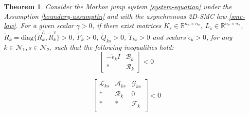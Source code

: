 \documentclass[conference]{IEEEtran}
\newtheorem{theorem}{Theorem}
\begin{document}
\begin{theorem}\label{theorem3}
	Consider the  Markov jump system \eqref{system-equation} under the Assumption \eqref{boundary-assumptin} and with the asynchronous 2D-SMC law \eqref{smc-law}.  For a given scalar $\gamma>0$, if there exist matrices $\tilde{K}_{s}\in\mathbb{R}^{n_u\times n_x}$, $L_{s}\in\mathbb{R}^{n_x\times n_x}$, $\tilde{R}_{k}=\mathrm{diag}\{\tilde{R}^{h}_{k},\tilde{R}^{v}_{k}\}>0$, $\tilde{F}_{k}>0$,  $\tilde{Q}_{ks}>0$, $\tilde{T}_{ks}>0$ and scalars $\tilde{\epsilon}_{k}>0$, for any $k\in\mathcal{N}_{1}, s\in\mathcal{N}_{2}$,  such that the following inequalities hold: 
	\begin{equation} \label{T3C1}
		\begin{bmatrix}
			-\tilde{\epsilon}_{k}I &\mathscr{B}_{k}\\
			*& \mathscr{R}_{k}
		\end{bmatrix} < 0
	\end{equation}
	
	\begin{equation} \label{T3C2}
		\begin{bmatrix}
			\mathscr{L}_{ks}&\mathscr{A}_{ks}&\mathscr{G}_{ks}\\
			*&\mathscr{R}_{k}&0\\
			*&*&\mathscr{F}_{k}\\
		\end{bmatrix}<0
	\end{equation}
	

\end{theorem}
\end{document}
